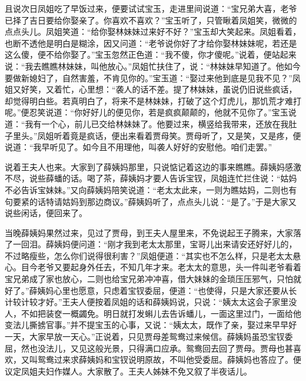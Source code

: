 \begin{parag}
    且说次日凤姐吃了早饭过来，便要试试宝玉，走进里间说道：“宝兄弟大喜，老爷已择了吉日要给你娶亲了。你喜欢不喜欢？”宝玉听了，只管瞅着凤姐笑，微微的点点头儿。凤姐笑道：“给你娶林妹妹过来好不好？”宝玉却大笑起来。凤姐看着，也断不透他是明白是糊涂，因又问道：“老爷说你好了才给你娶林妹妹呢，若还是这么傻，便不给你娶了。”宝玉忽然正色道：“我不傻，你才傻呢。”说着，便站起来说：“我去瞧瞧林妹妹，叫他放心。”凤姐忙扶住了，说：“林妹妹早知道了。他如今要做新媳妇了，自然害羞，不肯见你的。”宝玉道：“娶过来他到底是见我不见？”凤姐又好笑，又着忙，心里想：“袭人的话不差。提了林妹妹，虽说仍旧说些疯话，却觉得明白些。若真明白了，将来不是林妹妹，打破了这个灯虎儿，那饥荒才难打呢。”便忍笑说道：“你好好儿的便见你，若是疯疯颠颠的，他就不见你了。”宝玉说道：“我有一个心，前儿已交给林妹妹了。他要过来，横竖给我带来，还放在我肚子里头。”凤姐听着竟是疯话，便出来看着贾母笑。贾母听了，又是笑，又是疼，便说道：“我早听见了。如今且不用理他，叫袭人好好的安慰他。咱们走罢。”
\end{parag}


\begin{parag}
    说着王夫人也来。大家到了薛姨妈那里，只说惦记着这边的事来瞧瞧。薛姨妈感激不尽，说些薛蟠的话。喝了茶，薛姨妈才要人告诉宝钗，凤姐连忙拦住说：“姑妈不必告诉宝妹妹。”又向薛姨妈陪笑说道：“老太太此来，一则为瞧姑妈，二则也有句要紧的话特请姑妈到那边商议。”薛姨妈听了，点点头儿说：“是了。”于是大家又说些闲话，便回来了。
\end{parag}


\begin{parag}
    当晚薛姨妈果然过来，见过了贾母，到王夫人屋里来，不免说起王子腾来，大家落了一回泪。薛姨妈便问道：“刚才我到老太太那里，宝哥儿出来请安还好好儿的，不过略瘦些，怎么你们说得很利害？”凤姐便道：“其实也不怎么样，只是老太太悬心。目今老爷又要起身外任去，不知几年才来。老太太的意思，头一件叫老爷看着宝兄弟成了家也放心，二则也给宝兄弟冲冲喜，借大妹妹的金琐压压邪气，只怕就好了。”薛姨妈心里也愿意，只虑着宝钗委屈，便道：“也使得，只是大家还要从长计较计较才好。”王夫人便按着凤姐的话和薛姨妈说，只说：“姨太太这会子家里没人，不如把装奁一概蠲免。明日就打发蝌儿去告诉蟠儿，一面这里过门，一面给他变法儿撕掳官事。”并不提宝玉的心事，又说：“姨太太，既作了亲，娶过来早早好一天，大家早放一天心。”正说着，只见贾母差鸳鸯过来候信。薛姨妈虽恐宝钗委屈，然也没法儿，又见这般光景，只得满口应承。鸳鸯回去回了贾母。贾母也甚喜欢，又叫鸳鸯过来求薛姨妈和宝钗说明原故，不叫他受委屈。薛姨妈也答应了。便议定凤姐夫妇作媒人。大家散了。王夫人姊妹不免又叙了半夜话儿。
\end{parag}


